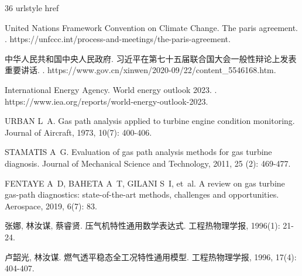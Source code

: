 \begin{thebibliography}{36}
\providecommand{\natexlab}[1]{#1}
\providecommand{\url}[1]{#1}
\expandafter\ifx\csname urlstyle\endcsname\relax\else
  \fi
\expandafter\ifx\csname href\endcsname\relax
  \DeclareUrlCommand{}
  \def\eprint#1#2{#2}
\else
  \def\doi#1{\href{https://doi.org/#1}{\nolinkurl{#1}}}
  \let\eprint\href
\fi

{United Nations Framework Convention on Climate Change}.
\newblock The paris agreement\allowbreak[EB/OL].
.
\newblock \url{https://unfccc.int/process-and-meetings/the-paris-agreement}.

{中华人民共和国中央人民政府}.
\newblock
  习近平在第七十五届联合国大会一般性辩论上发表重要讲话\allowbreak[EB/OL].
.
\newblock \url{https://www.gov.cn/xinwen/2020-09/22/content_5546168.htm}.

{International Energy Agency}.
\newblock World energy outlook 2023\allowbreak[EB/OL].
.
\newblock \url{https://www.iea.org/reports/world-energy-outlook-2023}.

URBAN L~A.
\newblock Gas path analysis applied to turbine engine condition
  monitoring\allowbreak[J].
\newblock Journal of Aircraft, 1973, 10\allowbreak (7): 400-406.

STAMATIS A~G.
\newblock Evaluation of gas path analysis methods for gas turbine
  diagnosis\allowbreak[J].
\newblock Journal of Mechanical Science and Technology, 2011, 25\allowbreak
  (2): 469-477.

FENTAYE A~D, BAHETA A~T, GILANI S~I, et~al.
\newblock A review on gas turbine gas-path diagnostics: state-of-the-art
  methods, challenges and opportunities\allowbreak[J].
\newblock Aerospace, 2019, 6\allowbreak (7): 83.

张娜, 林汝谋, 蔡睿贤.
\newblock 压气机特性通用数学表达式\allowbreak[J].
\newblock 工程热物理学报, 1996\allowbreak (1): 21-24.

卢韶光, 林汝谋.
\newblock 燃气透平稳态全工况特性通用模型\allowbreak[J].
\newblock 工程热物理学报, 1996, 17\allowbreak (4): 404-407.


\end{thebibliography}
